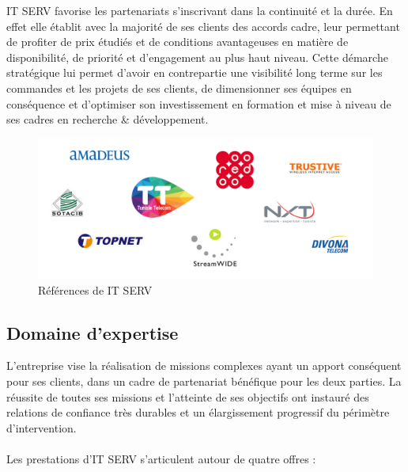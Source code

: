 \begin{spacing}{1.5}
IT SERV favorise les partenariats s'inscrivant dans la continuité et la durée. En effet elle établit avec la majorité de ses clients des accords cadre, leur permettant de profiter de prix étudiés et de conditions avantageuses en matière de disponibilité, de priorité et d'engagement au plus haut niveau. Cette démarche stratégique lui permet d'avoir en contrepartie une visibilité long terme sur les commandes et les projets de ses clients, de dimensionner ses équipes en conséquence et d'optimiser son investissement en formation et mise à niveau de ses cadres en recherche \& développement.

\begin{figure}[!ht]
\centering
\includegraphics[scale=0.8]{references.png}
\caption{Références de IT SERV}
\label{fig:references}
\end{figure}

\subsection{Domaine d'expertise}
L'entreprise vise la réalisation de missions complexes ayant un apport conséquent pour ses clients, dans un cadre de partenariat bénéfique pour les deux parties. La réussite de toutes ses missions et l'atteinte de ses objectifs ont instauré des relations de confiance très durables et un élargissement progressif du périmètre d'intervention.\\
\\
Les prestations d'IT SERV s'articulent autour de quatre offres :

\end{spacing}
